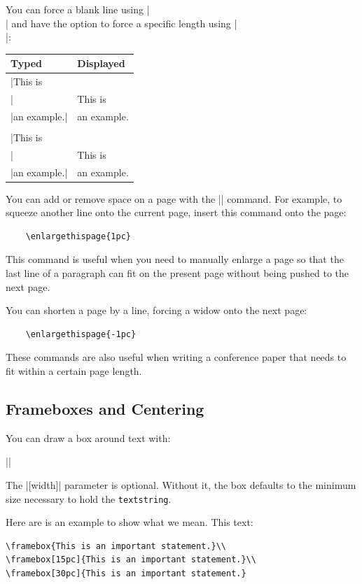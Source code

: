 You can force a blank line using |\\| and have the option to force a
specific length using |\\[3pt]|:
\begin{center}
\begin{tabular}{l|l}
Typed        & Displayed\\\hline
|This is\\|  & This is\\
|an example.| & an example.\\
\\
|This is\\[3pt]|  & This is\\[3pt]
|an example.| & an example.
\end{tabular}
\end{center}

You can add or remove space on a page with the |\enlargethispage| command. For
example, to squeeze another line onto the current page, insert this command
onto the page:

\begin{verbatim}
    \enlargethispage{1pc}
\end{verbatim}

This command is useful when you need to manually enlarge a page so that the
last line of a paragraph can fit on the present page without being pushed to
the next page. 

You can shorten a page by a line, forcing a widow onto the next page:

\begin{verbatim}
    \enlargethispage{-1pc}
\end{verbatim}


These commands are also useful when writing a conference paper that
needs to fit within a certain page length.

\subsection{Frameboxes and Centering}

You can draw a box around text with:

||

The |[width]| parameter is optional. Without it, the box defaults to the
minimum size necessary to hold the \texttt{textstring}.

Here are is an example to show what we mean. This text:

\begin{Verbatim}
\framebox{This is an important statement.}\\
\framebox[15pc]{This is an important statement.}\\
\framebox[30pc]{This is an important statement.}
\end{Verbatim}

